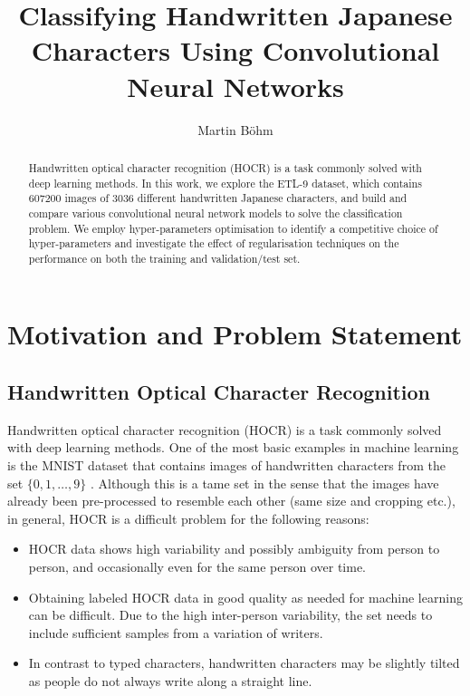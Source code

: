 \documentclass[british,12p]{article}
\title{Classifying Handwritten Japanese Characters Using Convolutional Neural Networks}
\author{Martin Böhm}
\begin{document}
	\maketitle
    \begin{abstract}
    	Handwritten optical character recognition (HOCR) is a task commonly solved with deep learning methods. In this work, we explore the ETL-9 dataset, which contains 607200 images of 3036 different handwritten Japanese characters, and build and compare various convolutional neural network models to solve the classification problem. We employ hyper-parameters optimisation to identify a competitive choice of hyper-parameters and investigate the effect of regularisation techniques on the performance on both the training and validation/test set.  
    \end{abstract}
    
    \tableofcontents
    \newpage
    \section{Motivation and Problem Statement}
    \subsection{Handwritten Optical Character Recognition}\label{secHOCR}
    Handwritten optical character recognition (HOCR) is a task commonly solved with deep learning methods. One of the most basic examples in machine learning is the MNIST dataset that contains images of handwritten characters from the set $\{0, 1, \dots, 9\}$ \cite{deepai:19}. Although this is a tame set in the sense that the images have already been pre-processed to resemble each other (same size and cropping etc.)\cite[p. 103]{buduma:17}, in general, HOCR is a difficult problem \cite{perwei:2014} for the following reasons:
    \begin{itemize}
    	\item HOCR data shows high variability and possibly ambiguity from person to person, and occasionally even for the same person over time.
    	\item Obtaining labeled HOCR data in good quality as needed for machine learning can be difficult. Due to the high inter-person variability, the set needs to include sufficient samples from a variation of writers.
    	\item In contrast to typed characters, handwritten characters may be slightly tilted as people do not always write along a straight line. 
    \end{itemize}
    
\end{document}
